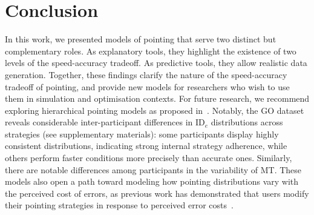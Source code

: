 \documentclass[acmlarge, manuscript,review]{acmart}
\newcommand{\ide}{\ensuremath{{\text{ID}_e}}\xspace}
\begin{document}
\section{Conclusion}
In this work, we presented models of pointing that serve two distinct but complementary roles. As explanatory tools, they highlight the existence of two levels of the speed-accuracy tradeoff. As predictive tools, they allow realistic data generation. 
Together, these findings clarify the nature of the speed-accuracy tradeoff of pointing, and provide new models for researchers who wish to use them in simulation and optimisation contexts.
For future research, we recommend exploring hierarchical pointing models as proposed in~\cite{zhao2022}. Notably, the GO dataset reveals considerable inter-participant differences in \ide distributions across strategies (see supplementary materials): some participants display highly consistent distributions, indicating strong internal strategy adherence, while others perform faster conditions more precisely than accurate ones. Similarly, there are notable differences among participants in the variability of MT.
These models also open a path toward modeling how pointing distributions vary with the perceived cost of errors, as previous work has demonstrated that users modify their pointing strategies in response to perceived error costs~\cite{bertucco2015}.
\end{document}
